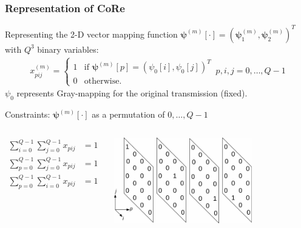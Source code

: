 \documentclass{beamer}
\begin{document}
\begin{frame}
  \frametitle{Representation of CoRe}
  Representing the 2-D vector mapping function
  $\bm{\psi}^{(m)}[\cdot]= (\bm{\psi}_1^{(m)}, \bm{\psi}_2^{(m)})^T$ with $Q^3$
  binary variables:
  \begin{align*}
    x_{pij}^{(m)} = \left\{ \begin{array}{cc}1 & \mbox{if } \bm{\psi}^{(m)}[p] =
    (\psi_0[i], \psi_0[j])^T\\ 0 & \mbox{otherwise.}\end{array} \right. \,
    p, i, j = 0,\ldots, Q - 1
  \end{align*}
  $\psi_0$ represents Gray-mapping for the original transmission (fixed).
  \begin{block}{Constraints: $\bm{\psi}^{(m)}[\cdot]$ as a permutation of
  $0,\ldots, Q - 1$}
    \begin{columns}
      \begin{align*}
        \sum_{i=0}^{Q-1}\sum_{j=0}^{Q-1}x_{pij} & = 1\\
        \sum_{p=0}^{Q-1}\sum_{j=0}^{Q-1}x_{pij} & = 1\\
        \sum_{p=0}^{Q-1}\sum_{i=0}^{Q-1}x_{pij} & = 1
      \end{align*}
      
      \begin{center}
        \includegraphics[width=0.7\textwidth]{figs/constraint_q3ap.pdf}
      \end{center}
      
    \end{columns}
  \end{block}
\end{frame}
\end{document}
